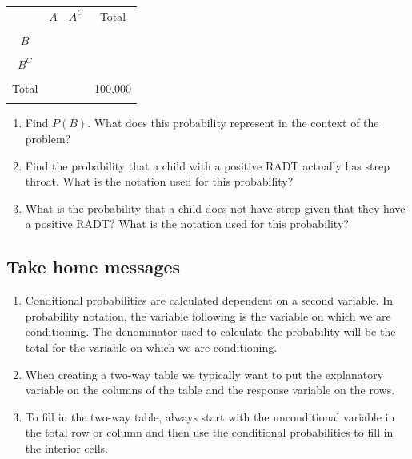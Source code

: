 \documentclass[
]{report}
\begin{document}
\begin{center}
\begin{tabular}{|c|c|c|c|} \hline
\hspace{0.8in} & \hspace{0.35in} $A$ \hspace{.35in} & \hspace{0.35in} $A^C$  \hspace{0.35in} & \hspace{0.3in} Total \hspace{0.3in} \\ 
& & & \\ \hline
$B$& & & \\ 
& & & \\ \hline
$B^C$& & & \\ 
& & & \\ \hline
Total & & & 100,000 \\ 
& & & \\ \hline
\end{tabular}
\end{center}
\vspace{.1in}

\begin{enumerate}
\def\labelenumi{\alph{enumi}.}
\setcounter{enumi}{2}
\item
  Find \(P(B)\). What does this probability represent in the context of the problem?
  \vspace{.8in}
\item
  Find the probability that a child with a positive RADT actually has strep throat. What is the notation used for this probability?
  \vspace{.8in}
\item
  What is the probability that a child does not have strep given that they have a positive RADT? What is the notation used for this probability?
\end{enumerate}

\newpage

\newpage

\subsection{Take home messages}\label{take-home-messages-4}

\begin{enumerate}
\def\labelenumi{\arabic{enumi}.}
\item
  Conditional probabilities are calculated dependent on a second variable. In probability notation, the variable following \texttt{\textbar{}} is the variable on which we are conditioning. The denominator used to calculate the probability will be the total for the variable on which we are conditioning.
\item
  When creating a two-way table we typically want to put the explanatory variable on the columns of the table and the response variable on the rows.
\item
  To fill in the two-way table, always start with the unconditional variable in the total row or column and then use the conditional probabilities to fill in the interior cells.
\end{enumerate}
\end{document}
